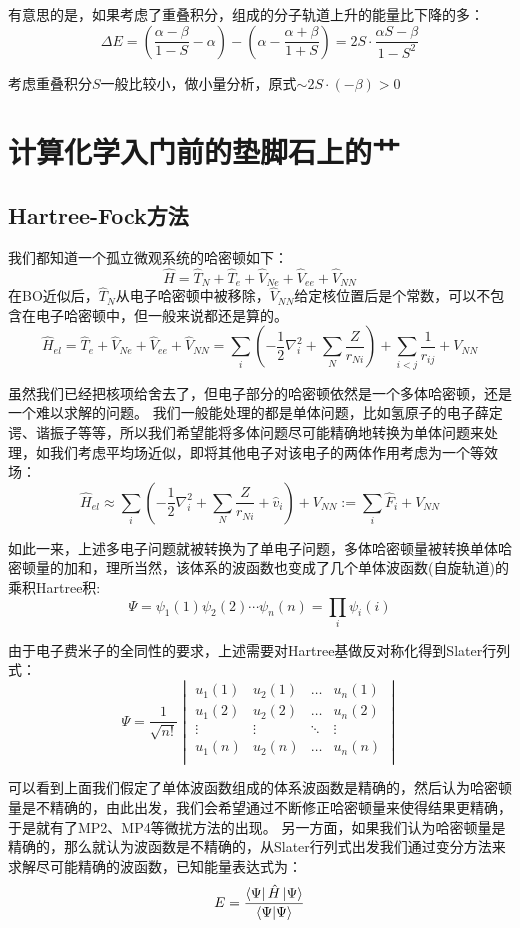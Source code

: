 有意思的是，如果考虑了重叠积分，组成的分子轨道上升的能量比下降的多：
\[\Delta E=\left(\frac{\alpha-\beta}{1-S}-\alpha\right)-\left(\alpha-\frac{\alpha+\beta}{1+S}\right)=2S \cdot \frac{\alpha S-\beta}{1-S^2}\]

考虑重叠积分$S$一般比较小，做小量分析，原式$\sim 2S \cdot (-\beta)>0$

\section{计算化学入门前的垫脚石上的艹}
\subsection{Hartree-Fock方法}
我们都知道一个孤立微观系统的哈密顿如下：
\[\hat{H}=\hat{T}_N+\hat{T}_e+\hat{V}_{Ne}+\hat{V}_{ee}+\hat{V}_{NN}\]
在BO近似后，$\hat{T}_N$从电子哈密顿中被移除，$\hat{V}_{NN}$给定核位置后是个常数，可以不包含在电子哈密顿中，但一般来说都还是算的。
\[\hat{H}_{el}=\hat{T}_e+\hat{V}_{Ne}+\hat{V}_{ee}+\hat{V}_{NN}=\sum_i\left(-\frac{1}{2}\nabla^2_i+\sum_N\frac{Z}{r_{Ni}}\right)+\sum_{i<j}\frac{1}{r_{ij}}+V_{NN}\]

虽然我们已经把核项给舍去了，但电子部分的哈密顿依然是一个多体哈密顿，还是一个难以求解的问题。
我们一般能处理的都是单体问题，比如氢原子的电子薛定谔、谐振子等等，所以我们希望能将多体问题尽可能精确地转换为单体问题来处理，如我们考虑平均场近似，即将其他电子对该电子的两体作用考虑为一个等效场：
\[\hat{H}_{el} \approx \sum_i\left(-\frac{1}{2}\nabla^2_i+\sum_N\frac{Z}{r_{Ni}}+\hat{v}_i\right)+V_{NN}:=\sum_i\hat{F}_i + V_{NN}\]

如此一来，上述多电子问题就被转换为了单电子问题，多体哈密顿量被转换单体哈密顿量的加和，理所当然，该体系的波函数也变成了几个单体波函数(自旋轨道)的乘积Hartree积:
\[\Psi = \psi_1(1)\psi_2(2)\cdots\psi_n(n)=\prod_i\psi_i(i)\]

由于电子费米子的全同性的要求，上述需要对Hartree基做反对称化得到Slater行列式：
\[\Psi=\frac{1}{\sqrt{n!}}
    \begin{vmatrix}
        u_1(1) & u_2(1) & \ldots & u_n(1)\\
        u_1(2) & u_2(2) & \ldots & u_n(2)\\
        \vdots & \vdots & \ddots & \vdots\\
        u_1(n) & u_2(n) & \ldots & u_n(n)\\
    \end{vmatrix}
\]

可以看到上面我们假定了单体波函数组成的体系波函数是精确的，然后认为哈密顿量是不精确的，由此出发，我们会希望通过不断修正哈密顿量来使得结果更精确，于是就有了MP2、MP4等微扰方法的出现。
另一方面，如果我们认为哈密顿量是精确的，那么就认为波函数是不精确的，从Slater行列式出发我们通过变分方法来求解尽可能精确的波函数，已知能量表达式为：
\[E=\frac{\bra{\Psi}\hat{H}\ket{\Psi}}{\bra{\Psi}\ket{\Psi}}\]

